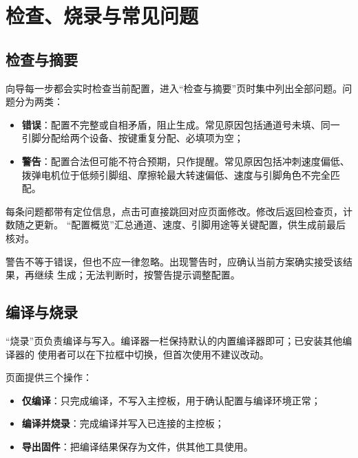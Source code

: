 
\chapter{检查、烧录与常见问题}
\label{app:concise-check}

\section{检查与摘要}

向导每一步都会实时检查当前配置，进入“检查与摘要”页时集中列出全部问题。问题分为两类：

\begin{itemize}
  \item \textbf{错误}：配置不完整或自相矛盾，阻止生成。常见原因包括通道号未填、同一
        引脚分配给两个设备、按键重复分配、必填项为空；
  \item \textbf{警告}：配置合法但可能不符合预期，只作提醒。常见原因包括冲刺速度偏低、
        拨弹电机位于低频引脚组、摩擦轮最大转速偏低、速度与引脚角色不完全匹配。
\end{itemize}

每条问题都带有定位信息，点击可直接跳回对应页面修改。修改后返回检查页，计数随之更新。
“配置概览”汇总通道、速度、引脚用途等关键配置，供生成前最后核对。

警告不等于错误，但也不应一律忽略。出现警告时，应确认当前方案确实接受该结果，再继续
生成；无法判断时，按警告提示调整配置。

\section{编译与烧录}

“烧录”页负责编译与写入。编译器一栏保持默认的内置编译器即可；已安装其他编译器的
使用者可以在下拉框中切换，但首次使用不建议改动。

页面提供三个操作：

\begin{itemize}
  \item \textbf{仅编译}：只完成编译，不写入主控板，用于确认配置与编译环境正常；
  \item \textbf{编译并烧录}：完成编译并写入已连接的主控板；
  \item \textbf{导出固件}：把编译结果保存为文件，供其他工具使用。
\end{itemize}

